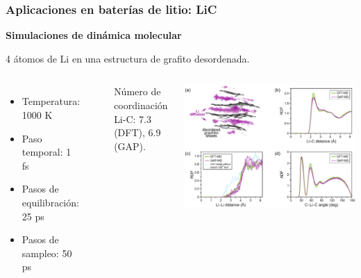 \documentclass[aspectratio=169]{beamer}
\let\oldtextbf\textbf
\renewcommand{\textbf}[1]{\textcolor{nordblue}{\oldtextbf{#1}}}
\begin{document}
    \begin{frame}
        \frametitle{Aplicaciones en baterías de litio: LiC}

        \textbf{Simulaciones de dinámica molecular}

        4 átomos de Li en una estructura de grafito desordenada.
        
        \begin{columns}
            \begin{itemize}
                \item Temperatura: 1000 K
                \item Paso temporal: 1 fs
                \item Pasos de equilibración: 25 ps 
                \item Pasos de sampleo: 50 ps
            \end{itemize}

            \ \pause

            Número de coordinación Li-C: 7.3 (DFT), 6.9 (GAP).

            \begin{center}
                \includegraphics[width=\columnwidth]{LiC-MD-results.png}
            \end{center}
        \end{columns}
    \end{frame}
    
\end{document}
